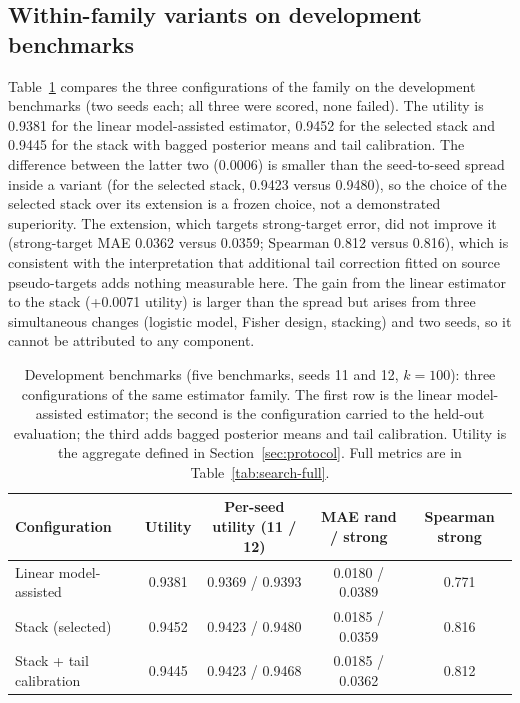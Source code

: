 \documentclass{article}
\begin{document}
\subsection{Within-family variants on development benchmarks}
Table~\ref{tab:search} compares the three configurations of the family on the development benchmarks (two seeds each; all three were scored, none failed). The utility is 0.9381 for the linear model-assisted estimator, 0.9452 for the selected stack and 0.9445 for the stack with bagged posterior means and tail calibration. %
The difference between the latter two (0.0006) is smaller than the seed-to-seed spread inside a variant (for the selected stack, 0.9423 versus 0.9480), so the choice of the selected stack over its extension is a frozen choice, not a demonstrated superiority. The extension, which targets strong-target error, did not improve it (strong-target MAE 0.0362 versus 0.0359; Spearman 0.812 versus 0.816), which is consistent with the interpretation that additional tail correction fitted on source pseudo-targets adds nothing measurable here. The gain from the linear estimator to the stack (+0.0071 utility) is larger than the spread but arises from three simultaneous changes (logistic model, Fisher design, stacking) and two seeds, so it cannot be attributed to any component.

\begin{table}[t]
\centering
\caption{Development benchmarks (five benchmarks, seeds 11 and 12, $k{=}100$): three configurations of the same estimator family. The first row is the linear model-assisted estimator; the second is the configuration carried to the held-out evaluation; the third adds bagged posterior means and tail calibration. Utility is the aggregate defined in Section~\ref{sec:protocol}. Full metrics are in Table~\ref{tab:search-full}.}
\label{tab:search}
\small
\begin{tabular}{lcccc}
\toprule
Configuration & Utility & Per-seed utility (11 / 12) & MAE rand / strong & Spearman strong \\
\midrule
Linear model-assisted & 0.9381 & 0.9369 / 0.9393 & 0.0180 / 0.0389 & 0.771 \\
Stack (selected) & 0.9452 & 0.9423 / 0.9480 & 0.0185 / 0.0359 & 0.816 \\
Stack + tail calibration & 0.9445 & 0.9423 / 0.9468 & 0.0185 / 0.0362 & 0.812 \\
\bottomrule
\end{tabular}
\end{table}
\end{document}

